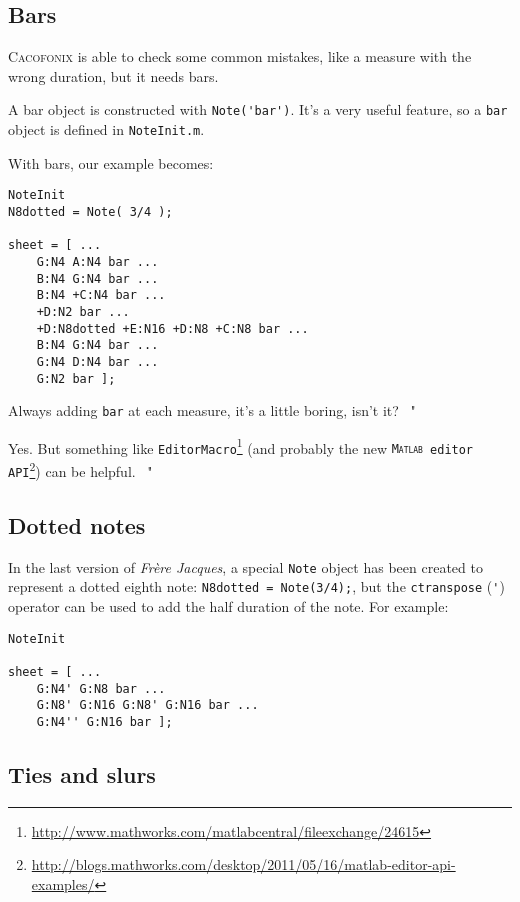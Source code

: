 \documentclass{article}
\newcommand\cacofonix{\textsc{Cacofonix}\xspace}
\newcommand\matlab{\textsc{Matlab}\xspace}
\newcommand\note{\lstinline!Note!\xspace}
\newcommand\frerejaques{\emph{Fr\`ere Jacques}\xspace}
\newcommand\noteInitFile{\texttt{NoteInit.m}\xspace}
\newcommand\exchange[2]{\texttt{#1}\footnote{\url{#2}}\xspace}
\newenvironment{meenv}{ \par \noindent \makebox[6em][r]{ \textcolor{mecolor}{Me}: " --~}}{~"}
\newenvironment{myselfenv}{ \par \noindent \makebox[6em][r]{ \textcolor{myselfcolor}{Myself}: " --~}}{~"}
\newcommand{ \me }[1]{%
\begin{meenv}%
	#1%
\end{meenv} }
\newcommand{ \myself }[1]{%
\begin{myselfenv}%
	#1%
\end{myselfenv} }
\begin{document}
\subsection{Bars}

\cacofonix is able to check some common mistakes, like a measure with the wrong duration, but it needs bars.

A bar object is constructed with \lstinline!Note('bar')!. It's a very useful feature, so a \lstinline!bar! object is defined in \noteInitFile.

With bars, our example becomes:
\begin{lstlisting}
NoteInit
N8dotted = Note( 3/4 );

sheet = [ ...
	G:N4 A:N4 bar ...
	B:N4 G:N4 bar ...
	B:N4 +C:N4 bar ...
	+D:N2 bar ...
	+D:N8dotted +E:N16 +D:N8 +C:N8 bar ...
	B:N4 G:N4 bar ...
	G:N4 D:N4 bar ...
	G:N2 bar ];
\end{lstlisting}

\me{Always adding \lstinline!bar! at each measure, it's a little boring, isn't it?}
\myself{Yes. But something like \exchange{EditorMacro}{http://www.mathworks.com/matlabcentral/fileexchange/24615} (and probably the new \exchange{\matlab editor API}{http://blogs.mathworks.com/desktop/2011/05/16/matlab-editor-api-examples/}) can be helpful.}

\subsection{Dotted notes}

In the last version of \frerejaques, a special \note object has been created to represent a dotted eighth note: \lstinline!N8dotted = Note(3/4);!, but the \lstinline!ctranspose! (\lstinline!'!) operator can be used to add the half duration of the note. For example: \\

\begin{lstlisting}
NoteInit

sheet = [ ...
	G:N4' G:N8 bar ...
	G:N8' G:N16 G:N8' G:N16 bar ...
	G:N4'' G:N16 bar ];
\end{lstlisting}

\subsection{Ties and slurs}
\end{document}

